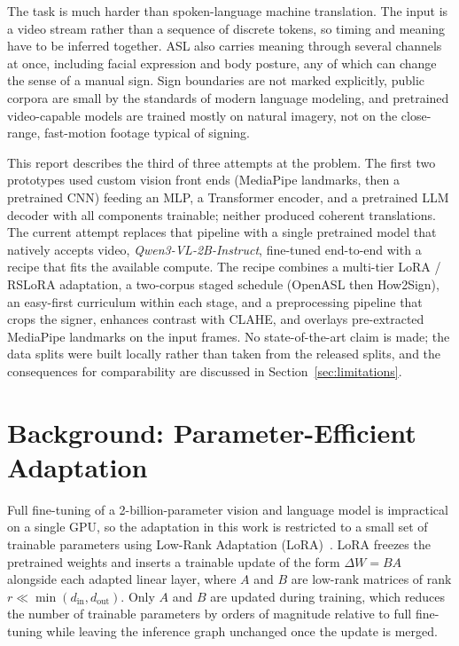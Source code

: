 \documentclass{article}
\begin{document}
The task is much harder than spoken-language machine translation. The input
is a video stream rather than a sequence of discrete tokens, so timing and
meaning have to be inferred together. ASL also carries meaning through
several channels at once, including facial expression and body posture, any
of which can change the sense of a manual sign. Sign boundaries are not
marked explicitly, public corpora are small by the standards of modern
language modeling, and pretrained video-capable models are trained mostly
on natural imagery, not on the close-range, fast-motion footage typical of
signing.

This report describes the third of three attempts at the problem. The
first two prototypes used custom vision front ends (MediaPipe landmarks,
then a pretrained CNN) feeding an MLP, a Transformer encoder, and a
pretrained LLM decoder with all components trainable; neither produced
coherent translations. The current attempt replaces that pipeline with a
single pretrained model that natively accepts video,
\emph{Qwen3-VL-2B-Instruct}, fine-tuned end-to-end with a recipe that fits
the available compute. The recipe combines a multi-tier LoRA / RSLoRA
adaptation, a two-corpus staged schedule (OpenASL then How2Sign), an
easy-first curriculum within each stage, and a preprocessing pipeline that
crops the signer, enhances contrast with CLAHE, and overlays pre-extracted
MediaPipe landmarks on the input frames. No state-of-the-art claim is
made; the data splits were built locally rather than taken from the
released splits, and the consequences for comparability are discussed in
Section~\ref{sec:limitations}.


\section{Background: Parameter-Efficient Adaptation}
\label{sec:background}
Full fine-tuning of a 2-billion-parameter vision and language model is
impractical on a single GPU, so the adaptation in this work is restricted to a
small set of trainable parameters using Low-Rank Adaptation
(LoRA)~\cite{hu2022lora}. LoRA freezes the pretrained weights and inserts a
trainable update of the form $\Delta W = B A$ alongside each adapted linear
layer, where $A$ and $B$ are low-rank matrices of rank
$r \ll \min(d_\mathrm{in}, d_\mathrm{out})$. Only $A$ and $B$ are updated
during training, which reduces the number of trainable parameters by orders of
magnitude relative to full fine-tuning while leaving the inference graph
unchanged once the update is merged.
\end{document}

